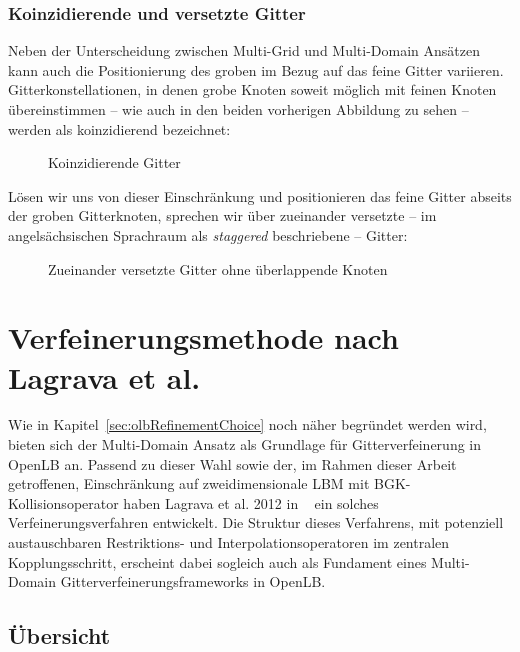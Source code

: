 \subsubsection{Koinzidierende und versetzte Gitter}

Neben der Unterscheidung zwischen Multi-Grid und Multi-Domain Ansätzen kann auch die Positionierung des groben im Bezug auf das feine Gitter variieren. Gitterkonstellationen, in denen grobe Knoten soweit möglich mit feinen Knoten übereinstimmen -- wie auch in den beiden vorherigen Abbildung zu sehen -- werden als koinzidierend bezeichnet:

\begin{figure}[h]
\centering

\caption{Koinzidierende Gitter}
\label{fig:CoincidingGrid}
\end{figure}

\noindent
Lösen wir uns von dieser Einschränkung und positionieren das feine Gitter abseits der groben Gitterknoten, sprechen wir über zueinander versetzte -- im angelsächsischen Sprachraum als \emph{staggered} beschriebene -- Gitter:

\begin{figure}[h]
\centering

\caption{Zueinander versetzte Gitter ohne überlappende Knoten}
\label{fig:StaggeredGrid}
\end{figure}

\newpage
\section{Verfeinerungsmethode nach Lagrava et al.}\label{kap:Lagrava}

Wie in Kapitel~\ref{sec:olbRefinementChoice} noch näher begründet werden wird, bieten sich der Multi-Domain Ansatz als Grundlage für Gitterverfeinerung in OpenLB an. Passend zu dieser Wahl sowie der, im Rahmen dieser Arbeit getroffenen, Einschränkung auf zweidimensionale LBM mit BGK-Kollisionsoperator haben Lagrava et al. 2012 in ~\cite{Lagrava12} ein solches Verfeinerungsverfahren entwickelt. Die Struktur dieses Verfahrens, mit potenziell austauschbaren Restriktions- und Interpolationsoperatoren im zentralen Kopplungsschritt, erscheint dabei sogleich auch als Fundament eines Multi-Domain Gitterverfeinerungsframeworks in OpenLB.

\subsection{Übersicht}

